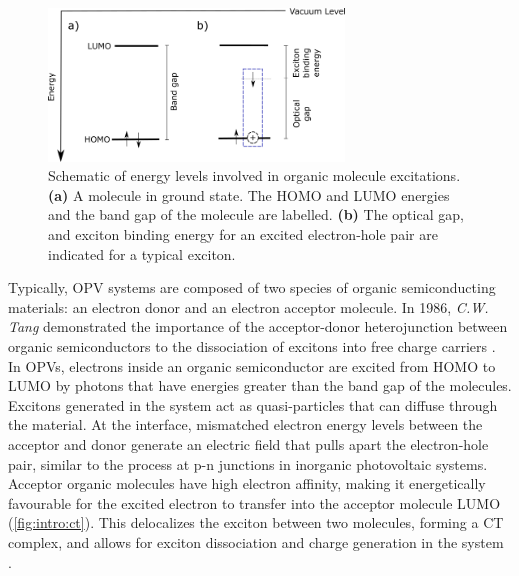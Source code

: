 \begin{figure}[h]
    \centering
    \includegraphics[width=0.7\textwidth]{pictures/exciton_energy.png}
    \caption{Schematic of energy levels involved in organic molecule excitations. \textbf{(a)} A molecule in ground state. The HOMO and LUMO energies and the band gap of the molecule are labelled. \textbf{(b)} The optical gap, and exciton binding energy for an excited electron-hole pair are indicated for a typical exciton.}
    \label{fig:intro:exciton}
\end{figure}

Typically, \ac{OPV} systems are composed of two species of organic semiconducting materials: an electron donor and an electron acceptor molecule. In 1986, \textit{C.W. Tang} demonstrated the importance of the acceptor-donor heterojunction between organic semiconductors to the dissociation of excitons into free charge carriers \citep{tang1986two}. In \acp{OPV}, electrons inside an organic semiconductor are excited from \ac{HOMO} to \ac{LUMO} by photons that have energies greater than the band gap of the molecules. Excitons generated in the system act as quasi-particles that can diffuse through the material. At the interface, mismatched electron energy levels between the acceptor and donor generate an electric field that pulls apart the electron-hole pair, similar to the process at p-n junctions in inorganic photovoltaic systems. Acceptor organic molecules have high electron affinity, making it energetically favourable for the excited electron to transfer into the acceptor molecule \ac{LUMO} (\autoref{fig:intro:ct}). This delocalizes the exciton between two molecules, forming a \ac{CT} complex, and allows for exciton dissociation and charge generation in the system \citep{bernardo2014delocalization}.

